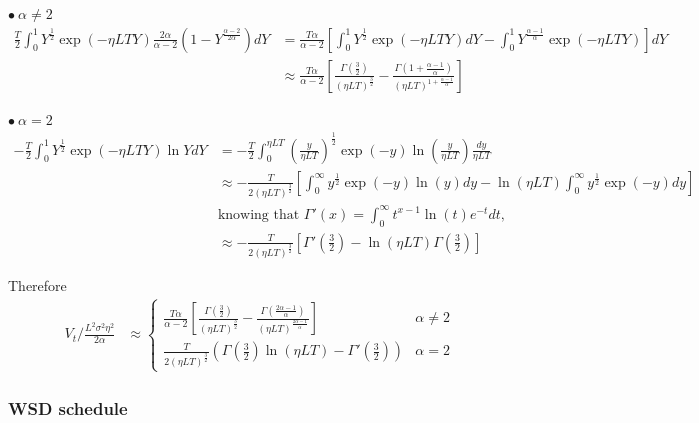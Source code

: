 \documentclass{article}
\begin{document}
$\bullet ~\alpha \neq 2$
\begin{align*}
\frac{T}{2}\int_{0}^{1}  Y^{\frac{1}{2}}   \exp\left({-\eta LTY}\right) \frac{2\alpha}{\alpha - 2} \left( 1 - Y^{\frac{\alpha - 2}{2\alpha}} \right) dY
&=
\frac{T\alpha}{\alpha - 2} \left[\int_{0}^{1}  Y^{\frac{1}{2}}   \exp\left({-\eta LTY}\right) dY-\int_{0}^{1}  Y^{\frac{\alpha - 1}{\alpha}}   \exp\left({-\eta LTY}\right)  \right] dY
\\&\approx
\frac{T\alpha}{\alpha - 2} \left[\frac{\Gamma(\frac{3}{2})}{(\eta LT)^{\frac{3}{2}}}  - \frac{\Gamma(1+\frac{\alpha-1}{\alpha})}{(\eta LT)^{1+\frac{\alpha-1}{\alpha}}} \right]
\end{align*}

$\bullet ~\alpha = 2$
\begin{align*}
-\frac{T}{2}\int_{0}^{1}  Y^{\frac{1}{2}}   \exp\left({-\eta LTY}\right)  \ln Y  dY
&=
-\frac{T}{2}\int_{0}^{\eta L T}  \left(\frac{y}{\eta LT}\right)^{\frac{1}{2}}   \exp\left({-y}\right)  \ln (\frac{y}{\eta LT})  \frac{dy}{\eta LT}
\\&\approx
-\frac{T}{2 (\eta LT)^{\frac{3}{2}}}
\left[\int_{0}^{\infty}  y^{\frac{1}{2}}   \exp\left({-y}\right)  \ln (y) dy - \ln(\eta LT)\int_{0}^{\infty}  y^{\frac{1}{2}}   \exp\left({-y}\right)  dy\right]
\\ &\text{knowing that }\Gamma'(x) = \textstyle\int_0^\infty t^{x-1}\ln( t )e^{-t} dt,
\\&\approx
-\frac{T}{2 (\eta LT)^{\frac{3}{2}}} \left[ \Gamma'(\frac{3}{2}) - \ln(\eta LT)\Gamma(\frac{3}{2}) \right]
\end{align*}

Therefore
\begin{align*}
V_t / \tfrac{L^2 \sigma^2 \eta^2}{2\alpha}&\approx
\left\{\begin{array}{ll}
     \displaystyle \frac{T\alpha}{\alpha - 2} \left[ \frac{\Gamma(\frac{3}{2})}{ (\eta L  T)^{\frac{3}{2}}} - \frac{\Gamma\left(\frac{2\alpha - 1}{\alpha}\right)}{(\eta L  T)^{\frac{2\alpha - 1}{\alpha}}} \right] & \alpha \neq 2\\
     \displaystyle\frac{T}{2(\eta LT)^{\frac{3}{2}} } \left( \Gamma\left(\frac{3}{2}\right) \ln(\eta L T) - \Gamma'\left(\frac{3}{2}\right) \right) & \alpha=2
\end{array}\right.
\end{align*}



\subsubsection{WSD schedule}
\end{document}
